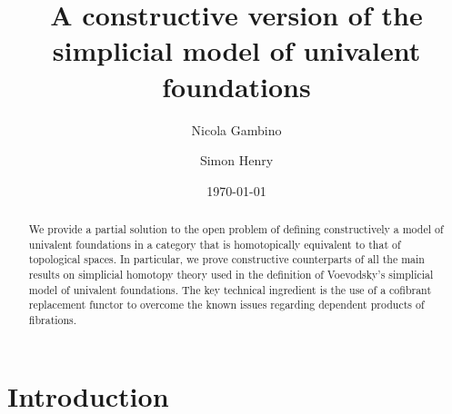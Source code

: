 \documentclass[reqno,10pt,a4paper,oneside,draft]{amsart}
\title[]{A constructive version of the \\ simplicial model of univalent foundations}
\begin{document}
\begin{abstract}
We provide a partial solution to the open problem of defining constructively a model of univalent foundations in a category that is homotopically equivalent to that of topological spaces.
In particular, we prove constructive counterparts of all the main results on simplicial homotopy theory
used in the definition of Voevodsky's simplicial model of univalent foundations. The key technical ingredient
is the use of a cofibrant replacement functor to overcome the known issues regarding dependent products of fibrations.
\end{abstract}

\author{Nicola Gambino}
\address{School of Mathematics, University of Leeds, Leeds LS2 9JT, United Kingdom}


\author{Simon Henry}


 \date{\today}
 
 

\maketitle

\tableofcontents

\newpage

\section*{Introduction} 
\end{document}
